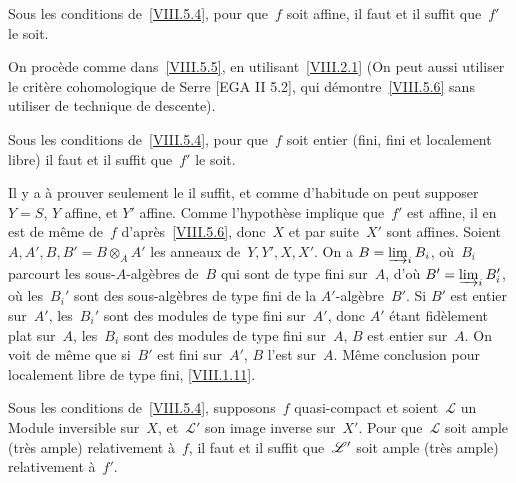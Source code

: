 \begin{corollaire}
\label{VIII.5.6}
Sous les conditions de~\ref{VIII.5.4}, pour que~$f$ soit affine, il
faut et il suffit que~$f'$ le soit.
\end{corollaire}

On proc\`ede comme dans~\ref{VIII.5.5}, en utilisant~\ref{VIII.2.1}
(On peut aussi utiliser le crit\`ere cohomologique de Serre [EGA II
5.2], qui d\'emontre~\ref{VIII.5.6} sans utiliser de technique de
descente).

\begin{corollaire}
\label{VIII.5.7}
Sous les conditions de~\ref{VIII.5.4}, pour que~$f$ soit entier
(\resp fini, \resp fini et localement libre) il faut et il suffit
que~$f'$ le soit.
\end{corollaire}

Il y a \`a prouver seulement le \og il suffit\fg, et comme d'habitude
on peut supposer $Y=S$, $Y$ affine, et $Y'$ affine. Comme
l'hypoth\`ese implique que~$f'$ est affine, il en est de m\^eme
de~$f$ d'apr\`es~\ref{VIII.5.6}, donc~$X$ et par suite~$X'$ sont
affines. Soient~$A,A',B,B'=B\otimes_{A}A'$ les anneaux
de~$Y,Y',X,X'$. On a $B=\varinjlim_i B_{i}$, o\`u~$B_{i}$
parcourt les sous-$A$-alg\`ebres de~$B$ qui sont de type fini
sur~$A$, d'o\`u $B'=\varinjlim_i B_{i}'$, o\`u
les~$B_{i}'$ sont des sous-alg\`ebres de type fini de la
$A'$-alg\`ebre~$B'$. Si $B'$ est entier
sur~$A'$,
les~$B_{i}'$ sont des modules de type fini sur~$A'$, donc $A'$
\'etant fid\`element plat sur~$A$, les~$B_{i}$ sont des modules de
type fini sur~$A$, \ie $B$ est entier sur~$A$. On voit de m\^eme
que si~$B'$ est fini sur~$A'$, $B$ l'est sur~$A$. M\^eme conclusion
pour \og localement libre de type fini\fg, \cf \ref{VIII.1.11}.

\begin{corollaire}
\label{VIII.5.8}
Sous
les conditions de~\ref{VIII.5.4}, supposons~$f$ quasi-compact et
soient~$\mathcal{L}$ un Module inversible sur~$X$, et~$\mathcal{L}'$
son image inverse sur~$X'$. Pour que~$\mathcal{L}$ soit ample
(\resp tr\`es ample) relativement \`a~$f$, il faut et il suffit
que~$\cal{L}'$
soit ample (\resp tr\`es ample) relativement \`a~$f'$.
\end{corollaire}

